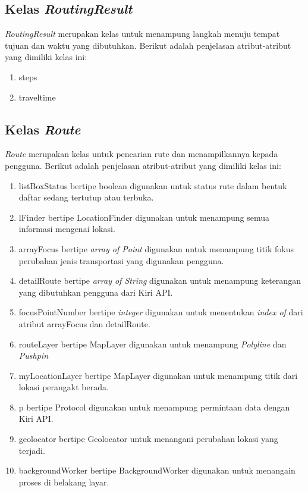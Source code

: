 \subsection{Kelas \textit{RoutingResult}}
\label{lab:Kelas RoutingResult}
\hspace{0.5cm} \textit{RoutingResult} merupakan kelas untuk menampung langkah menuju tempat tujuan dan waktu yang dibutuhkan. Berikut adalah penjelasan atribut-atribut yang dimiliki kelas ini:
\begin{enumerate}
	\item steps
	\item traveltime
\end{enumerate}

\subsection{Kelas \textit{Route}}
\label{lab:Kelas Route}
\hspace{0.5cm} \textit{Route} merupakan kelas untuk pencarian rute dan menampilkannya kepada pengguna. Berikut adalah penjelasan atribut-atribut yang dimiliki kelas ini:
\begin{enumerate}
	\item listBoxStatus bertipe boolean digunakan untuk status rute dalam bentuk daftar sedang tertutup atau terbuka. 
	\item lFinder bertipe LocationFinder digunakan untuk menampung semua informasi mengenai lokasi.
	\item arrayFocus bertipe \textit{array of Point} digunakan untuk menampung titik fokus perubahan jenis transportasi yang digunakan pengguna.  
	\item detailRoute bertipe \textit{array of String} digunakan untuk menampung keterangan yang dibutuhkan pengguna dari Kiri API.
	\item focusPointNumber bertipe \textit{integer} digunakan untuk menentukan \textit{index of} dari atribut arrayFocus dan detailRoute.
	\item routeLayer bertipe MapLayer digunakan untuk menampung \textit{Polyline} dan \textit{Pushpin}
	\item myLocationLayer bertipe MapLayer digunakan untuk menampung titik dari lokasi perangakt berada.
	\item p bertipe Protocol digunakan untuk menampung permintaan data dengan Kiri API.
	\item geolocator bertipe Geolocator untuk menangani perubahan lokasi yang terjadi.
	\item backgroundWorker bertipe BackgroundWorker digunakan untuk menangain proses di belakang layar.
\end{enumerate}

